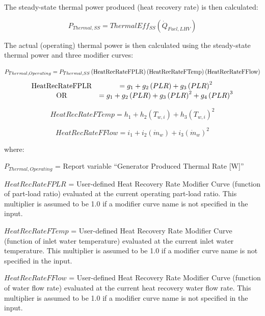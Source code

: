 The steady-state thermal power produced (heat recovery rate) is then calculated:

\begin{equation}
{P_{Thermal,SS}} = ThermalEf{f_{SS}}\left( {{{\dot Q}_{Fuel,LHV}}} \right)
\end{equation}

The actual (operating) thermal power is then calculated using the steady-state thermal power and three modifier curves:

\begin{equation}
  P_{Thermal,Operating} = P_{Thermal,SS} \PB{\text{HeatRecRateFPLR}} \PB{\text{HeatRecRateFTemp}} \PB{\text{HeatRecRateFFlow}}
\end{equation}
\begin{equation}
  \begin{array}{cc}
    \text{HeatRecRateFPLR} &= g_1 + g_2 \PB{PLR} + g_3 \PB{PLR}^2  \\
                 \text{OR} &= g_1 + g_2 \PB{PLR} + g_3 \PB{PLR}^2 + g_4 \PB{PLR}^3
  \end{array}
\end{equation}

\begin{equation}
HeatRecRateFTemp = {h_1} + {h_2}\left( {{T_{w,i}}} \right) + {h_3}{\left( {{T_{w,i}}} \right)^2}
\end{equation}

\begin{equation}
HeatRecRateFFlow = {i_1} + {i_2}\left( {{{\dot m}_w}} \right) + {i_3}{\left( {{{\dot m}_w}} \right)^2}
\end{equation}

where:

\({P_{Thermal,Operating}}\) = Report variable ``Generator Produced Thermal Rate {[}W{]}''

\(HeatRecRateFPLR\) = User-defined Heat Recovery Rate Modifier Curve (function of part-load ratio) evaluated at the current operating part-load ratio. This multiplier is assumed to be 1.0 if a modifier curve name is not specified in the input.

\(HeatRecRateFTemp\) = User-defined Heat Recovery Rate Modifier Curve (function of inlet water temperature) evaluated at the current inlet water temperature. This multiplier is assumed to be 1.0 if a modifier curve name is not specified in the input.

\(HeatRecRateFFlow\) = User-defined Heat Recovery Rate Modifier Curve (function of water flow rate) evaluated at the current heat recovery water flow rate. This multiplier is assumed to be 1.0 if a modifier curve name is not specified in the input.

